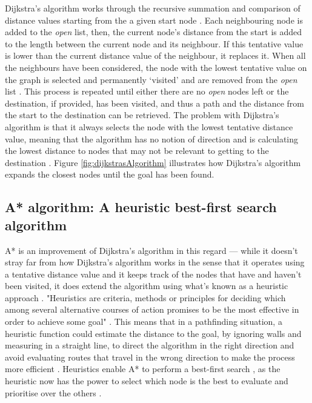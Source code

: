 \documentclass[11pt, a4paper]{report}
\begin{document}
Dijkstra's algorithm works through the recursive summation and comparison of distance values starting from the a given start node \parencite[269]{dijkstra1959note}. Each neighbouring node is added to the \emph{open} list, then, the current node's distance from the start is added to the length between the current node and its neighbour. If this tentative value is lower than the current distance value of the neighbour, it replaces it. When all the neighbours have been considered, the node with the lowest tentative value on the graph is selected and permanently `visited' and are removed from the \emph{open} list \parencite{dijkstra1959note}. This process is repeated until either there are no \emph{open} nodes left or the destination, if provided, has been visited, and thus a path and the distance from the start to the destination can be retrieved. The problem with Dijkstra's algorithm is that it always selects the node with the lowest tentative distance value, meaning that the algorithm has no notion of direction and is calculating the lowest distance to nodes that may not be relevant to getting to the destination \parencite[214]{millington2019ai}. Figure \ref{fig:dijkstrasAlgorithm} illustrates how Dijkstra's algorithm expands the closest nodes until the goal has been found.

\subsection{A* algorithm: A heuristic best-first search algorithm}
\label{subsec:aStarAlgorithm}

A* is an improvement of Dijkstra's algorithm in this regard \parencite[101]{hart1968formal} --- while it doesn't stray far from how Dijkstra's algorithm works in the sense that it operates using a tentative distance value and it keeps track of the nodes that have and haven't been visited, it does extend the algorithm using what's known as a heuristic approach \parencite[126]{cui2011based}. "Heuristics are criteria, methods or principles for deciding which among several alternative courses of action promises to be the most effective in order to achieve some goal" \parencite[3]{pearl1984heuristics}. This means that in a pathfinding situation, a heuristic function could estimate the distance to the goal, by ignoring walls and measuring in a straight line, to direct the algorithm in the right direction and avoid evaluating routes that travel in the wrong direction to make the process more efficient \parencite[127]{cui2011based}. Heuristics enable A* to perform a best-first search \parencite[46]{yap2002grid}, as the heuristic now has the power to select which node is the best to evaluate and prioritise over the others \parencite[94]{russell2016artificial}.
\end{document}
